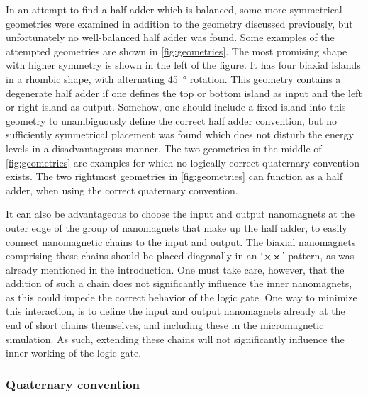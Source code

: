 \documentclass[11pt,a4paper,english,twoside]{article}
\begin{document}
In an attempt to find a half adder which is balanced, some more symmetrical geometries were examined in addition to the geometry discussed previously, but unfortunately no well-balanced half adder was found. Some examples of the attempted geometries are shown in \cref{fig:geometries}. The most promising shape with higher symmetry is shown in the left of the figure. It has four biaxial islands in a rhombic shape, with alternating \SI{45}{\degree} rotation. This geometry contains a degenerate half adder if one defines the top or bottom island as input and the left or right island as output. Somehow, one should include a fixed island into this geometry to unambiguously define the correct half adder convention, but no sufficiently symmetrical placement was found which does not disturb the energy levels in a disadvantageous manner. The two geometries in the middle of \cref{fig:geometries} are examples for which no logically correct quaternary convention exists. The two rightmost geometries in \cref{fig:geometries} can function as a half adder, when using the correct quaternary convention. \par
It can also be advantageous to choose the input and output nanomagnets at the outer edge of the group of nanomagnets that make up the half adder, to easily connect nanomagnetic chains to the input and output. The biaxial nanomagnets comprising these chains should be placed diagonally in an `$\cross \cross$'-pattern, as was already mentioned in the introduction. One must take care, however, that the addition of such a chain does not significantly influence the inner nanomagnets, as this could impede the correct behavior of the logic gate. One way to minimize this interaction, is to define the input and output nanomagnets already at the end of short chains themselves, and including these in the micromagnetic simulation. As such, extending these chains will not significantly influence the inner working of the logic gate.

\subsubsection{Quaternary convention}
\end{document}
